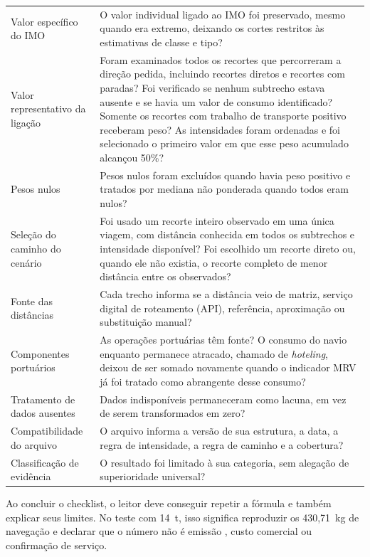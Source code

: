 \begin{longtable}{L{0.29\textwidth}L{0.65\textwidth}}
Valor específico do IMO & O valor individual ligado ao IMO foi preservado, mesmo quando era extremo, deixando os cortes restritos às estimativas de classe e tipo? \\
Valor representativo da ligação & Foram examinados todos os recortes que percorreram a direção pedida, incluindo recortes diretos e recortes com paradas? Foi verificado se nenhum subtrecho estava ausente e se havia um valor de consumo identificado? Somente os recortes com trabalho de transporte positivo receberam peso? As intensidades foram ordenadas e foi selecionado o primeiro valor em que esse peso acumulado alcançou 50\%? \\
Pesos nulos & Pesos nulos foram excluídos quando havia peso positivo e tratados por mediana não ponderada quando todos eram nulos? \\
Seleção do caminho do cenário & Foi usado um recorte inteiro observado em uma única viagem, com distância conhecida em todos os subtrechos e intensidade disponível? Foi escolhido um recorte direto ou, quando ele não existia, o recorte completo de menor distância entre os observados? \\
Fonte das distâncias & Cada trecho informa se a distância veio de matriz, serviço digital de roteamento (API), referência, aproximação ou substituição manual? \\
Componentes portuários & As operações portuárias têm fonte? O consumo do navio enquanto permanece atracado, chamado de \emph{hoteling}, deixou de ser somado novamente quando o indicador MRV já foi tratado como abrangente desse consumo? \\
Tratamento de dados ausentes & Dados indisponíveis permaneceram como lacuna, em vez de serem transformados em zero? \\
Compatibilidade do arquivo & O arquivo informa a versão de sua estrutura, a data, a regra de intensidade, a regra de caminho e a cobertura? \\
Classificação de evidência & O resultado foi limitado à sua categoria, sem alegação de superioridade universal? \\
\bottomrule
\end{longtable}
\endgroup

Ao concluir o checklist, o leitor deve conseguir repetir a fórmula e também explicar seus limites. No teste com 14~t, isso significa reproduzir os 430,71~kg de navegação e declarar que o número não é emissão \wtw{}, custo comercial ou confirmação de serviço.
